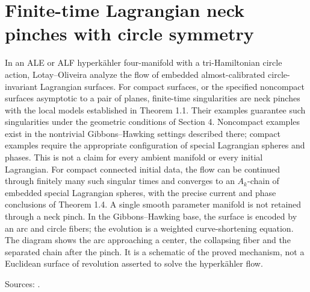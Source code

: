 \chapter{Finite-time Lagrangian neck pinches with circle symmetry}\label{sec:catalogue-lotay-oliveira-neck-pinches}
\begin{example}\label{ex:catalogue-lotay-oliveira-neck-pinches}
In an ALE or ALF hyperk\"ahler four-manifold with a tri-Hamiltonian circle action, Lotay--Oliveira analyze the flow of embedded almost-calibrated circle-invariant Lagrangian surfaces. For compact surfaces, or the specified noncompact surfaces asymptotic to a pair of planes, finite-time singularities are neck pinches with the local models established in Theorem 1.1. Their examples guarantee such singularities under the geometric conditions of Section 4. Noncompact examples exist in the nontrivial Gibbons--Hawking settings described there; compact examples require the appropriate configuration of special Lagrangian spheres and phases. This is not a claim for every ambient manifold or every initial Lagrangian.
For compact connected initial data, the flow can be continued through finitely many such singular times and converges to an $A_k$-chain of embedded special Lagrangian spheres, with the precise current and phase conclusions of Theorem 1.4. A single smooth parameter manifold is not retained through a neck pinch. In the Gibbons--Hawking base, the surface is encoded by an arc and circle fibers; the evolution is a weighted curve-shortening equation. The diagram shows the arc approaching a center, the collapsing fiber and the separated chain after the pinch. It is a schematic of the proved mechanism, not a Euclidean surface of revolution asserted to solve the hyperk\"ahler flow.
\par Sources: \cite{CatLotayOliveira2023}.
\end{example}

